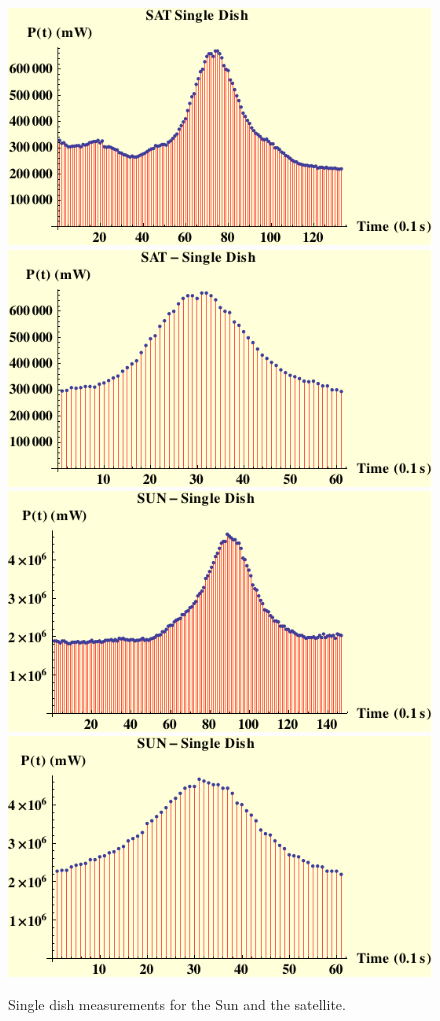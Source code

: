  \begin{figure}[htb]
\begin{center}
 \includegraphics[scale=0.8]{plots/single/1.pdf}
 \includegraphics[scale=0.8]{plots/single/2.pdf}
 \includegraphics[scale=0.8]{plots/single/3.pdf}
 \includegraphics[scale=0.8]{plots/single/4.pdf}

\caption{Single dish measurements for the Sun and the satellite.}
\label{voltpow4}
\end{center}
\end{figure}


